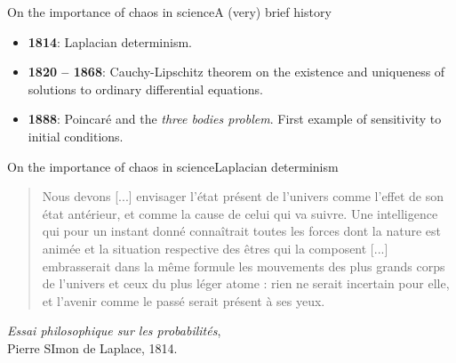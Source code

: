 \documentclass[usenames,dvipsnames,svgnames,10pt,aspectratio=169]{beamer}
\begin{document}
\begin{frame}[t, c]{On the importance of chaos in science}{A (very) brief history}
	\begin{itemize}
		\item \alert{\textbf{1814}}: Laplacian determinism.

		\bigskip

		\item \alert{\textbf{1820 -- 1868}}: Cauchy-Lipschitz theorem on the existence and uniqueness of solutions to ordinary differential equations.

		\bigskip

		\item \alert{\textbf{1888}}: Poincaré and the \emph{three bodies problem}. First example of sensitivity to initial conditions.
	\end{itemize}

	\vspace{1cm}
\end{frame}

\begin{frame}[t, c]{On the importance of chaos in science}{Laplacian determinism}
	\begin{quote}
		Nous devons [...] envisager l'état présent de l'univers comme l'effet de son état antérieur, et comme la cause de celui qui va suivre. Une intelligence qui pour un instant donné connaîtrait toutes les forces dont la nature est animée et la situation respective des êtres qui la composent [...] embrasserait dans la même formule les mouvements des plus grands corps de l'univers et ceux du plus léger atome : rien ne serait incertain pour elle, et l'avenir comme le passé serait présent à ses yeux.
	\end{quote}

	\begin{flushright}
		\emph{Essai philosophique sur les probabilités}, \\ Pierre SImon de Laplace, 1814.
	\end{flushright}
\end{frame}
\end{document}
